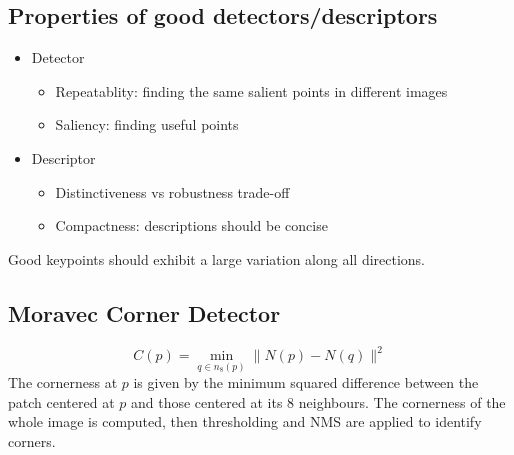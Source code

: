 \documentclass{article}
\begin{document}
\subsection{Properties of good detectors/descriptors}

\begin{itemize}
  \item Detector \begin{itemize}
      \item Repeatablity: finding the same salient points in different images 
      \item Saliency: finding useful points 
    \end{itemize}
  \item Descriptor \begin{itemize}
      \item Distinctiveness vs robustness trade-off
      \item Compactness: descriptions should be concise
    \end{itemize}
\end{itemize}
Good keypoints should exhibit a large variation along all directions. 
\subsection{Moravec Corner Detector}
\[
  C(p) = \min_{q\in n_8(p)} \|N(p)-N(q)\|^2 
\]
The cornerness at $p$ is given by the minimum squared difference between the patch centered at $p$ and those centered at its 8 neighbours. The cornerness of the whole image is computed, then thresholding and NMS are applied to identify corners.
\end{document}
